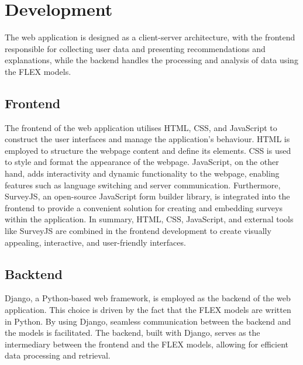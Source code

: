 \chapter{Development} 

The web application is designed as a client-server architecture, 
with the frontend responsible for collecting user data and presenting recommendations and explanations, 
while the backend handles the processing and analysis of data using the FLEX models.


\section{Frontend}

The frontend of the web application utilises HTML, CSS, and JavaScript to construct the user interfaces and manage the application's behaviour. 
HTML is employed to structure the webpage content and define its elements. 
CSS is used to style and format the appearance of the webpage. 
JavaScript, on the other hand, adds interactivity and dynamic functionality to the webpage, enabling features such as language switching and server communication. 
Furthermore, SurveyJS, an open-source JavaScript form builder library, is integrated into the frontend to provide a convenient solution for creating and embedding surveys within the application. 
In summary, HTML, CSS, JavaScript, and external tools like SurveyJS are combined in the frontend development to create visually appealing, interactive, and user-friendly interfaces. 


\section{Backtend}

Django, a Python-based web framework, is employed as the backend of the web application. 
This choice is driven by the fact that the FLEX models are written in Python. 
By using Django, seamless communication between the backend and the models is facilitated. 
The backend, built with Django, serves as the intermediary between the frontend and the FLEX models, allowing for efficient data processing and retrieval. 
